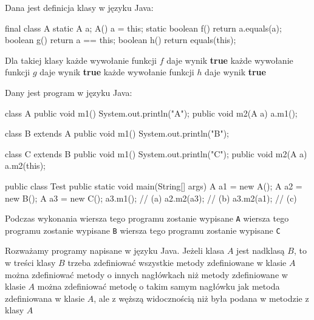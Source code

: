 \begin{problems}
    \prob Dana jest definicja klasy w języku Java:
    \begin{java}
        final class A {
            static A a;
            A() { a = this; }
            static boolean f() { return a.equals(a); }
            boolean g() { return a == this; }
            boolean h() { return equals(this); }
        }
    \end{java}
    Dla takiej klasy
    \answers
    {każde wywołanie funkcji $f$ daje wynik \textbf{true}}
    {każde wywołanie funkcji $g$ daje wynik \textbf{true}}
    {każde wywołanie funkcji $h$ daje wynik \textbf{true}}

    \textbf{}
    
    \prob Dany jest program w języku Java:
    \begin{java}
        class A {
            public void m1() { System.out.println("A"); }
            public void m2(A a) { a.m1(); }
        }
        
        class B extends A {
            public void m1() { System.out.println("B"); }
        }
        
        class C extends B {
            public void m1() { System.out.println("C"); }
            public void m2(A a) { a.m2(this); }
        }
        
        public class Test {
            public static void main(String[] args) {
                A a1 = new A();
                A a2 = new B();
                A a3 = new C();
                a3.m1();   // (a)
                a2.m2(a3); // (b)
                a3.m2(a1); // (c)
            }
        }
    \end{java}
    Podczas wykonania
    \answers
    {wiersza  tego programu zostanie wypisane \texttt{A}}
    {wiersza  tego programu zostanie wypisane \texttt{B}}
    {wiersza  tego programu zostanie wypisane \texttt{C}}

    \prob Rozważamy programy napisane w języku Java. Jeżeli klasa $A$ jest nadklasą $B$, to w treści klasy $B$
    \answers
    {trzeba zdefiniować wszystkie metody zdefiniowane w klasie $A$}
    {można zdefiniować metody o innych nagłówkach niż metody zdefiniowane w klasie $A$}
    {można zdefiniować metodę o takim samym nagłówku jak metoda zdefiniowana w klasie $A$, ale z węższą widocznością niż była podana w metodzie z klasy $A$}


\end{problems}
